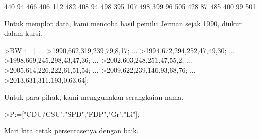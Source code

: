 \documentclass[a4paper,10pt]{article}
\begin{document}
\begin{eulernotebook}
\begin{euleroutput}
            440            94           466 
            406           112           482 
            408            94           498 
            395           107           498 
            399            96           505 
            428            87           485 
            400            99           501 
\end{euleroutput}
\begin{eulercomment}
Untuk memplot data, kami mencoba hasil pemilu Jerman sejak 1990,
diukur dalam kursi.
\end{eulercomment}
\begin{eulerprompt}
>BW := [ ...
>1990,662,319,239,79,8,17; ...
>1994,672,294,252,47,49,30; ...
>1998,669,245,298,43,47,36; ...
>2002,603,248,251,47,55,2; ...
>2005,614,226,222,61,51,54; ...
>2009,622,239,146,93,68,76; ...
>2013,631,311,193,0,63,64];
\end{eulerprompt}
\begin{eulercomment}
Untuk para pihak, kami menggunakan serangkaian nama.
\end{eulercomment}
\begin{eulerprompt}
>P:=["CDU/CSU","SPD","FDP","Gr","Li"];
\end{eulerprompt}
\begin{eulercomment}
Mari kita cetak persentasenya dengan baik.


\end{eulercomment}
\end{eulernotebook}
\end{document}
